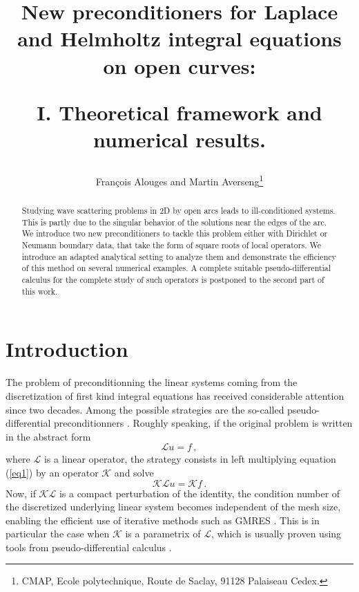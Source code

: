 \documentclass[a4paper]{article}
\title{New preconditioners for Laplace and Helmholtz integral equations on open curves: \\
	\vspace{0,5cm}
	\begin{Large}
		I. Theoretical framework and numerical results. 
	\end{Large}}
\author{Fran\c{c}ois Alouges and Martin Averseng\footnote{CMAP, Ecole polytechnique, Route de Saclay, 91128 Palaiseau Cedex.}}
\begin{document}
\maketitle

\begin{abstract}
Studying wave scattering problems in 2D by open arcs leads to ill-conditioned systems. This is partly due to the singular behavior
of the solutions near the edges of the arc. We introduce two new preconditioners to tackle this problem either with Dirichlet or Neumann 
boundary data, that take the form of square roots of local operators. We introduce an adapted analytical setting to analyze them and 
demonstrate the efficiency of this method on several numerical examples. A complete suitable pseudo-differential calculus for the
complete study of such operators is postponed to the second part of this work.
\end{abstract}

\section{Introduction}

The problem of preconditionning the linear systems coming from the discretization of first kind integral equations
has received considerable attention since two decades. Among the possible strategies are the so-called pseudo-differential 
preconditionners \cite{alouges2007stable,alouges2005new,antoine2007generalized,christiansen2002preconditioner,hiptmair2014mesh,Steinbach98}. 
Roughly speaking, if the original problem is written in the abstract form
\begin{equation}
	\mathcal{L}u=f\,,
	\label{eq1}
\end{equation}
where $\mathcal{L}$ is a linear operator, the strategy consists in left multiplying equation (\ref{eq1}) by an operator $\mathcal{K}$ and solve
\begin{equation}
	\mathcal{K}\mathcal{L}u=\mathcal{K}f\,.	
\end{equation}
Now, if $\mathcal{K}\mathcal{L}$ is a compact perturbation of the identity, the condition number of the discretized underlying linear system 
becomes independent of the mesh size, enabling the efficient use of iterative methods such as GMRES \cite{saad1986gmres}. This is in particular the 
case when $\mathcal{K}$ is a parametrix of $\mathcal{L}$, which is usually proven using tools from pseudo-differential calculus 
\cite{steinbach1998construction}.
\end{document}
